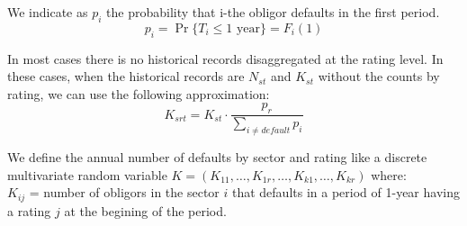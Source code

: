 \documentclass[11pt,fleqn]{book} %
\begin{document}
\begin{notation}
	We indicate as $p_i$ the probability that i-the obligor defaults in 
	the first period.
	\begin{displaymath}
		p_i = \Pr\{T_i \le 1 \text{ year}\} = F_i(1) 
	\end{displaymath}
\end{notation}

In most cases there is no historical records disaggregated at the rating
level. In these cases, when the historical records are $N_{st}$ and 
$K_{st}$ without the counts by rating, we can use the following approximation:
\begin{displaymath}
	K_{srt} = K_{st} \cdot \frac{p_r}{\displaystyle \sum_{i \ne default} p_i}
\end{displaymath}


\begin{definition}
	We define the annual number of defaults by sector and rating like a
	discrete multivariate random variable 
	$K=(K_{11}, \dots, K_{1r}, \dots, K_{k1}, \dots, K_{kr})$ where:
	\\
	$K_{ij}$ = number of obligors in the sector $i$ that defaults in a
	period of 1-year having a rating $j$ at the begining of the period.
\end{definition}
\end{document}
